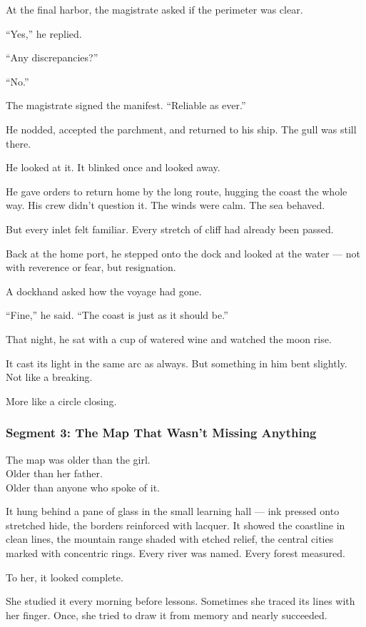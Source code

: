 \documentclass[9pt]{article}
\begin{document}
At the final harbor, the magistrate asked if the perimeter was clear.

``Yes,'' he replied.

``Any discrepancies?''

``No.''

The magistrate signed the manifest. ``Reliable as ever.''

He nodded, accepted the parchment, and returned to his ship. The gull was still there.

He looked at it. It blinked once and looked away.

He gave orders to return home by the long route, hugging the coast the whole way. His crew didn’t question it. The winds were calm. The sea behaved.

But every inlet felt familiar. Every stretch of cliff had already been passed.

Back at the home port, he stepped onto the dock and looked at the water — not with reverence or fear, but resignation.

A dockhand asked how the voyage had gone.

``Fine,'' he said. ``The coast is just as it should be.''

That night, he sat with a cup of watered wine and watched the moon rise.

It cast its light in the same arc as always. But something in him bent slightly. Not like a breaking.

More like a circle closing.

\newpage

\subsubsection*{Segment 3: The Map That Wasn’t Missing Anything}

The map was older than the girl.\\
Older than her father.\\
Older than anyone who spoke of it.

It hung behind a pane of glass in the small learning hall — ink pressed onto stretched hide, the borders reinforced with lacquer. It showed the coastline in clean lines, the mountain range shaded with etched relief, the central cities marked with concentric rings. Every river was named. Every forest measured.

To her, it looked complete.

She studied it every morning before lessons. Sometimes she traced its lines with her finger. Once, she tried to draw it from memory and nearly succeeded.
\end{document}
